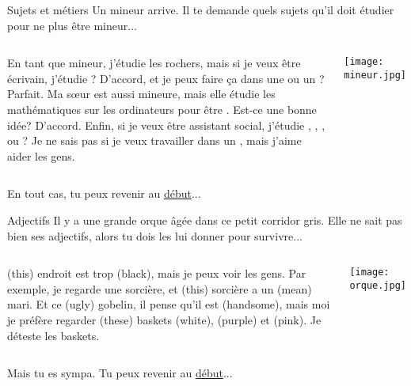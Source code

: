 \documentclass{beamer}
\begin{document}
  \begin{frame}{Sujets et métiers}
    \hypertarget{sujets}{}
    Un mineur arrive.
    Il te demande quels sujets qu'il doit étudier pour ne plus être mineur...

    \vspace{0.25cm}
    \begin{columns}
        \small
        En tant que mineur, j'étudie les rochers, mais si je veux être écrivain, j'étudie \underline{}?
        D'accord, et je peux faire ça dans une \underline{} ou un \underline{}?
        Parfait.
        Ma sœur est aussi mineure, mais elle étudie les mathématiques sur les ordinateurs pour être \underline{}.
        Est-ce une bonne idée?
        D'accord.
        Enfin, si je veux être assistant social, j'étudie \underline{}, \underline{}, \underline{}, ou \underline{}?
        Je ne sais pas si je veux travailler dans un \underline{}, mais j'aime aider les gens.

        \begin{center}
          \texttt{[image: mineur.jpg]}
        \end{center}
    \end{columns}
    \vspace{0.25cm}
    En tout cas, tu peux revenir au \hyperlink{début}{début}...
  \end{frame}

  \begin{frame}{Adjectifs}
    \hypertarget{adjectifs}{}
    Il y a une grande orque âgée dans ce petit corridor gris.
    Elle ne sait pas bien ses adjectifs, alors tu dois les lui donner pour survivre...

    \vspace{0.25cm}
    \begin{columns}
        \small
        \underline{} (this) endroit est trop \underline{} (black), mais je peux voir les gens.
        Par exemple, je regarde une sorcière, et \underline{} (this) sorcière a un \underline{} (mean) mari.
        Et ce \underline{} (ugly) gobelin, il pense qu'il est \underline{} (handsome), mais moi je préfère regarder \underline{} (these) baskets \underline{} (white), \underline{} (purple) et \underline{} (pink).
        Je déteste les baskets.

        \begin{center}
          \texttt{[image: orque.jpg]}
        \end{center}
    \end{columns}
    \vspace{0.25cm}
    Mais tu es sympa.
    Tu peux revenir au \hyperlink{début}{début}...
  \end{frame}
\end{document}
